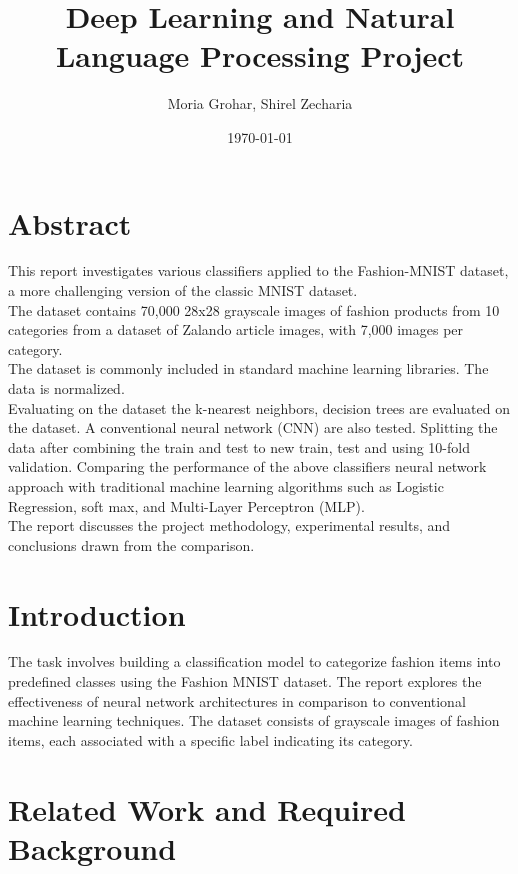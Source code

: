 \documentclass{article}
\title{Deep Learning and Natural Language Processing Project}
\author{Moria Grohar, Shirel Zecharia}
\date{\today}
\begin{document}
\maketitle

\section{Abstract}
This report investigates various classifiers applied to the Fashion-MNIST dataset, a more challenging version of the classic MNIST dataset.\\
The dataset contains 70,000 28x28 grayscale images of fashion products from 10 categories from a dataset of Zalando article images, with 7,000 images per category.\\
The dataset is commonly included in standard machine learning libraries. The data is normalized. \\
Evaluating on the dataset the k-nearest neighbors, decision trees are evaluated on the dataset. A conventional neural network (CNN) are also tested.
Splitting the data after combining the train and test to new train, test and using 10-fold validation.
Comparing the performance of the above classifiers neural network approach with traditional machine learning algorithms such as Logistic Regression, soft max, and Multi-Layer Perceptron (MLP).\\
The report discusses the project methodology, experimental results, and conclusions drawn from the comparison.
 
\section{Introduction}
The task involves building a classification model to categorize fashion items into predefined classes using the Fashion MNIST dataset.
The report explores the effectiveness of neural network architectures in comparison to conventional machine learning techniques. The dataset consists of grayscale images of fashion items, each associated with a specific label indicating its category.


\section{Related Work and Required Background}
\end{document}
